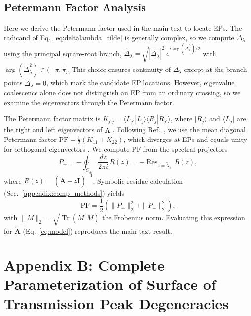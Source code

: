 \documentclass[%
  reprint,
  amsmath,amssymb,
  aps,
  prapplied,
  superscriptaddress,
  longbibliography]{revtex4-2}
\begin{document}
\subsection{\label{appendix-sec:petermann}Petermann Factor Analysis}

Here we derive the Petermann factor used in the main text to locate EPs. The radicand of Eq.~\ref{eq:deltalambda_tilde} is generally complex, so we compute $\tilde{\Delta}_\lambda$ using the principal square-root branch, $\tilde{\Delta}_\lambda = \sqrt{|\tilde{\Delta}_\lambda|^2}\, e^{i \arg(\tilde{\Delta}_\lambda^2)/2}$ with $\arg(\tilde{\Delta}_\lambda^2) \in (-\pi, \pi]$. This choice ensures continuity of $\tilde{\Delta}_\lambda$ except at the branch points $\tilde{\Delta}_\lambda = 0$, which mark the candidate EP locations. However, eigenvalue coalescence alone does not distinguish an EP from an ordinary crossing, so we examine the eigenvectors through the Petermann factor.

The Petermann factor matrix is $K_{j'j} = \langle L_{j'}|L_j\rangle \langle R_j|R_{j'}\rangle$, where $|R_j\rangle$ and $\langle L_j|$ are the right and left eigenvectors of $\tilde{\boldsymbol{A}}$ \cite{siegman_excess_1989, ashida_non-hermitian_2020}. Following Ref.~\cite{ashida_non-hermitian_2020}, we use the mean diagonal Petermann factor $\mathrm{PF} = \tfrac{1}{2}(K_{11} + K_{22})$, which diverges at EPs and equals unity for orthogonal eigenvectors \cite{zheng_mathcalpt_2010}. We compute $\mathrm{PF}$ from the spectral projectors
\begin{equation}
    P_\pm = -\oint_{C_\pm} \frac{dz}{2\pi i}\, R(z) = -\operatorname{Res}_{z = \tilde{\lambda}_\pm} R(z),
\end{equation}
where $R(z) = (\tilde{\boldsymbol{A}} - z\boldsymbol{I})^{-1}$. Symbolic residue calculation (Sec.~\ref{appendix:comp_methods}) yields
\begin{equation}
    \mathrm{PF} = \frac{1}{2}\left( \|P_+\|_2^2 + \|P_-\|_2^2 \right),
\end{equation}
with $\|M\|_2 = \sqrt{\operatorname{Tr}(M^\dagger M)}$ the Frobenius norm. Evaluating this expression for $\tilde{\boldsymbol{A}}$ (Eq.~\ref{eq:model}) reproduces the main-text result.


\section{\label{appendix:b} Appendix B: Complete Parameterization of Surface of Transmission Peak Degeneracies}
\end{document}
